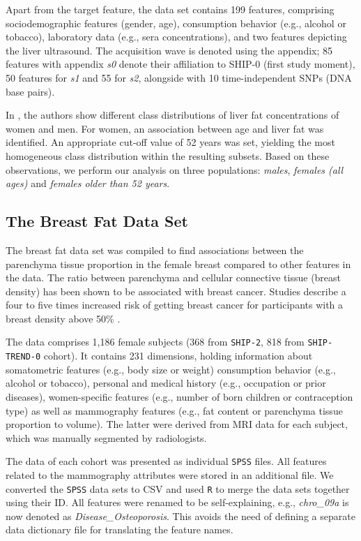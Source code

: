 \documentclass[journal]{style/vgtc} 			          %
\begin{document}
Apart from the target feature, the data set contains 199 features, comprising sociodemographic features (gender, age), consumption behavior (e.g., alcohol or tobacco), laboratory data (e.g., sera concentrations), and two features depicting the liver ultrasound.
The acquisition wave is denoted using the appendix; 85 features with appendix \emph{s0} denote their affiliation to SHIP-0 (first study moment), 50 features for \emph{s1} and 55 for \emph{s2}, alongside with 10 time-independent SNPs (DNA base pairs).

In \cite{Niemann2014}, the authors show different class distributions of liver fat concentrations of women and men.
For women, an association between age and liver fat was identified.
An appropriate cut-off value of 52 years was set, yielding the most homogeneous class distribution within the resulting subsets.
Based on these observations, we perform our analysis on three populations: \emph{males}, \emph{females (all ages)} and \emph{females older than 52 years}.
\subsection{The Breast Fat Data Set}
The breast fat data set was compiled to find associations between the parenchyma tissue proportion in the female breast compared to other features in the data.
The ratio between parenchyma and cellular connective tissue (breast density) has been shown to be associated with breast cancer.
Studies describe a four to five times increased risk of getting breast cancer for participants with a breast density above 50\% \cite{Mccormack2006}.

The data comprises 1,186 female subjects (368 from \texttt{SHIP-2}, 818 from \texttt{SHIP-TREND-0} cohort).
It contains 231 dimensions, holding information about somatometric features (e.g., body size or weight) consumption behavior (e.g., alcohol or tobacco), personal and medical history (e.g., occupation or prior diseases), women-specific features (e.g., number of born children or contraception type) as well as mammography features (e.g., fat content or parenchyma tissue proportion to volume).
The latter were derived from MRI data for each subject, which was manually segmented by radiologists.

The data of each cohort was presented as individual \texttt{SPSS} files.
All features related to the mammography attributes were stored in an additional file.
We converted the \texttt{SPSS} data sets to CSV and used \texttt{R} to merge the data sets together using their ID.
All features were renamed to be self-explaining, e.g., \emph{chro\_09a} is now denoted as \emph{Disease\_Osteoporosis}.
This avoids the need of defining a separate data dictionary file for translating the feature names.
\end{document}
